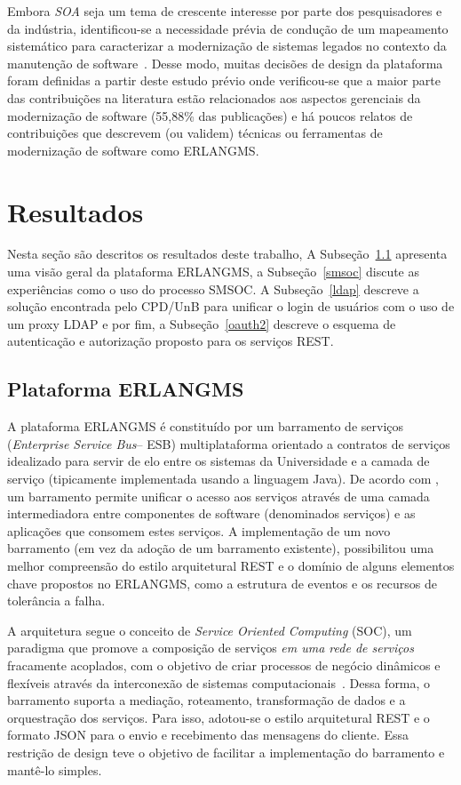 \documentclass[12pt]{article}
\begin{document}
Embora \emph{SOA} seja um tema
de crescente interesse por parte dos pesquisadores e da indústria, identificou-se 
a necessidade prévia de condução de um mapeamento sistemático para 
caracterizar a modernização de sistemas legados no 
contexto da manutenção de software~\cite{desystematic2016}. 
Desse modo, muitas decisões de design da plataforma
foram definidas a partir deste estudo prévio onde verificou-se
que a maior parte das contribuições na literatura
estão relacionados aos aspectos gerenciais da modernização de software (55,88\% das
publicações) e há poucos relatos de contribuições que descrevem (ou validem)
técnicas ou ferramentas de modernização de software como ERLANGMS.


\section{Resultados}

Nesta seção são descritos os resultados deste trabalho, A Subseção~\ref{plataforma}
apresenta uma visão geral da plataforma ERLANGMS, a Subseção~\ref{smsoc}
discute as experiências como o uso do processo SMSOC. A Subseção~\ref{ldap}
descreve a solução encontrada pelo CPD/UnB para unificar
o login de usuários com o uso de um proxy LDAP e por fim, 
a Subseção~\ref{oauth2}
descreve o esquema de autenticação e autorização proposto 
para os serviços REST.


\subsection{Plataforma ERLANGMS}\label{plataforma}

A plataforma ERLANGMS é constituído 
por um barramento de serviços (\textit{Enterprise Service Bus}-- ESB) 
multiplataforma orientado a contratos de serviços
idealizado para servir de elo entre os 
sistemas da Universidade e a camada de serviço (tipicamente 
implementada usando a linguagem Java). 
De acordo com \cite{ModelDriApproRest:2014}, 
um barramento permite unificar o acesso aos serviços 
através de uma camada intermediadora entre componentes de software (denominados serviços) e 
as aplicações que consomem estes serviços. 
A implementa\c c\~{a}o 
de um novo barramento (em vez da ado\c c\~{a}o de um barramento existente), 
possibilitou uma melhor compreens\~{a}o do estilo arquitetural REST e o dom\'{i}nio de alguns 
elementos chave propostos no ERLANGMS, como a estrutura de eventos e os recursos de toler\^{a}ncia 
a falha. 

A arquitetura segue o conceito de \textit{Service Oriented Computing} (SOC), 
um paradigma que promove a composição de serviços \emph{em uma rede de serviços} 
fracamente acoplados, com o objetivo de criar processos de negócio dinâmicos 
e flexíveis através da interconexão de sistemas computacionais~\cite{ModelDriApproRest:2014}. 
Dessa forma, o barramento suporta a mediação, roteamento, 
transformação de dados e a orquestração dos serviços. Para isso, adotou-se o 
estilo arquitetural REST e o formato JSON para o envio e 
recebimento das mensagens do cliente. Essa restrição de design teve o 
objetivo de facilitar a implementação do barramento e mantê-lo simples. 
\end{document}
